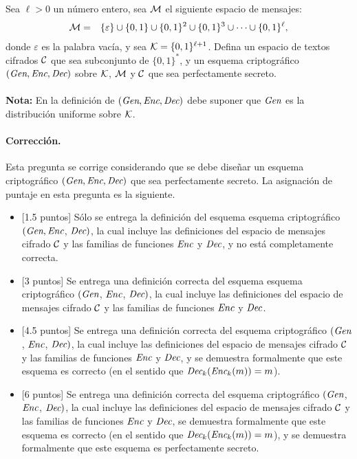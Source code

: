 
Sea $\ell > 0$ un número entero, sea $\mathcal{M}$ el siguiente espacio de mensajes:
\begin{eqnarray*}
  \mathcal{M} &=& \{\varepsilon\} \cup \{0,1\} \cup \{0,1\}^2 \cup \{0,1\}^3 \cup \cdots \cup
  \{0,1\}^{\ell},
\end{eqnarray*}
donde $\varepsilon$ es la palabra vacía, y sea $\mathcal{K}
= \{0,1\}^{\ell+1}$. Defina un espacio de textos cifrados $\mathcal{C}$ que sea
subconjunto de $\{0,1\}^*$, y un esquema criptográfico
$(\textit{Gen}, \textit{Enc}, \textit{Dec})$ sobre $\mathcal{K}$, $\mathcal{M}$ y $\mathcal{C}$ que sea perfectamente secreto.
\\
\\
{\bf Nota:} En la definición de $(\textit{Gen}, \textit{Enc}, \textit{Dec})$ debe
suponer que $\textit{Gen}$ es la distribución uniforme sobre $\mathcal{K}$.


\medskip

\paragraph{Corrección.}
Esta pregunta se corrige considerando que se debe diseñar un esquema
criptográfico $(\textit{Gen}, \textit{Enc}, \textit{Dec})$ que sea perfectamente secreto. La
asignación de puntaje en esta pregunta es la siguiente.
\begin{itemize}
    \item{[1.5 puntos]} Sólo se entrega la definición del esquema
esquema criptográfico $(\textit{Gen}, \textit{Enc}$, $\textit{Dec})$, la cual incluye las
definiciones del espacio de mensajes cifrado $\mathcal{C}$ y las familias de
funciones $\textit{Enc}$ y $\textit{Dec}$, y no está completamente correcta.

    \item{[3 puntos]} Se entrega una definición correcta del esquema
esquema criptográfico $(\textit{Gen}$, $\textit{Enc}$, $\textit{Dec})$, la cual incluye las
definiciones del espacio de mensajes cifrado $\mathcal{C}$ y las familias de
funciones $\textit{Enc}$ y $\textit{Dec}$.

    \item{[4.5 puntos]} Se entrega una definición correcta del esquema
criptográfico $(\textit{Gen}$, $\textit{Enc}$, $\textit{Dec})$, la cual incluye las definiciones
del espacio de mensajes cifrado $\mathcal{C}$ y las familias de funciones
$\textit{Enc}$ y $\textit{Dec}$, y se demuestra formalmente que este esquema es correcto
(en el sentido que $\textit{Dec}_k(\textit{Enc}_k(m)) = m$).

    \item{[6 puntos]} Se entrega una definición correcta del esquema
criptográfico $(\textit{Gen}$, $\textit{Enc}$, $\textit{Dec})$, la cual incluye las definiciones
del espacio de mensajes cifrado $\mathcal{C}$ y las familias de funciones
$\textit{Enc}$ y $\textit{Dec}$, se demuestra formalmente que este esquema es correcto
(en el sentido que $\textit{Dec}_k(\textit{Enc}_k(m)) = m$), y se demuestra
formalmente que este esquema es perfectamente secreto.
\end{itemize}

\medskip
